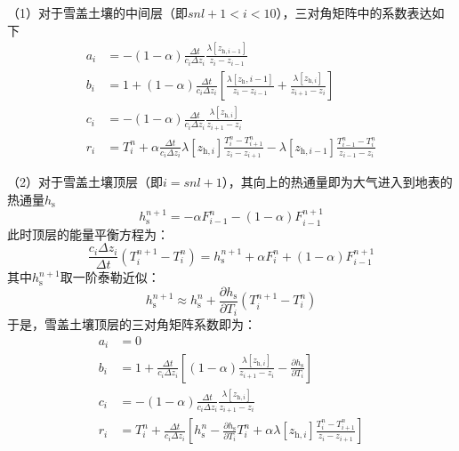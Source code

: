 （1）对于雪盖土壤的中间层（即$snl+1<i<10$），三对角矩阵中的系数表达如下
\begin{equation}
  \begin{aligned}
    a_i &= -\left(1-\alpha \right) \frac{\Delta t}{c_i \Delta z_i} \frac{\lambda \left[z_{\mathrm{h},i-1}\right]}{z_i-z_{i-1}} \\
    b_i &= 1+\left(1-\alpha \right) \frac{\Delta t}{c_i \Delta z_i} \left[\frac{\lambda \left[z_{\mathrm{h}},i-1\right]}{z_i-z_{i-1}} + \frac{\lambda \left[z_{\mathrm{h},i}\right]}{z_{i+1}-z_i}\right] \\
    c_i &= -\left(1-\alpha \right)\frac{\Delta t}{c_i\Delta z_i}\frac{\lambda \left[z_{\mathrm{h},i}\right]}{z_{i+1}-z_i} \\
    r_i &= T_{i}^{n}+\alpha \frac{\Delta t}{c_{i} \Delta z_{i}} \lambda\left[z_{\mathrm{h},i}\right] \frac{T_{i}^{n}-T_{i+1}^{n}}{z_{i}-z_{i+1}}-\lambda\left[z_{\mathrm{h},i-1}\right] \frac{T_{i-1}^{n}-T_{i}^{n}}{z_{i-1}-z_{i}}
  \end{aligned}
\end{equation}

（2）对于雪盖土壤顶层（即$i=snl+1$），其向上的热通量即为大气进入到地表的热通量$h_{\mathrm {s}} $
\begin{equation}
  h^{n+1}_{\mathrm {s}} =-\alpha F^n_{i-1}-\left(1-\alpha\right)F^{n+1}_{i-1}
\end{equation}
此时顶层的能量平衡方程为：
\begin{equation}
  \frac{c_i\Delta z_i}{\Delta t}\left(T^{n+1}_i-T^n_i\right) = h^{n+1}_{\mathrm {s}} +\alpha F^n_i+\left(1-\alpha \right)F^{n+1}_{i-1}
\end{equation}
其中$h^{n+1}_{\mathrm {s}} $取一阶泰勒近似：
\begin{equation}
  h^{n+1}_{\mathrm {s}}  \approx h^n_{\mathrm {s}}  + \frac{\partial h_{\mathrm {s}} }{\partial T_i}\left(T^{n+1}_i-T^n_i\right)
\end{equation}
于是，雪盖土壤顶层的三对角矩阵系数即为：
\begin{equation}
  \begin{aligned}
    a_{i} &= 0 \\
    b_{i} &= 1+\frac{\Delta t}{c_{i} \Delta z_{i}}\left[(1-\alpha) \frac{\lambda\left[z_{\mathrm{h},i}\right]}{z_{i+1}-z_{i}}-\frac{\partial h_{\mathrm{s}}}{\partial T_{i}}\right] \\
    c_{i} &= -(1-\alpha) \frac{\Delta t}{c_{i} \Delta z_{i}} \frac{\lambda\left[z_{\mathrm{h},i}\right]}{z_{i+1}-z_{i}} \\
    r_{i} &= T_{i}^{n}+\frac{\Delta t}{c_{i} \Delta z_{i}}\left[h_{\mathrm{s}}^{n}-\frac{\partial h_{\mathrm{s}}}{\partial T_{i}} T_{i}^{n}+\alpha \lambda\left[z_{\mathrm{h},i}\right] \frac{T_{i}^{n}-T_{i+1}^{n}}{z_{i}-z_{i+1}}\right]
  \end{aligned}
\end{equation}

